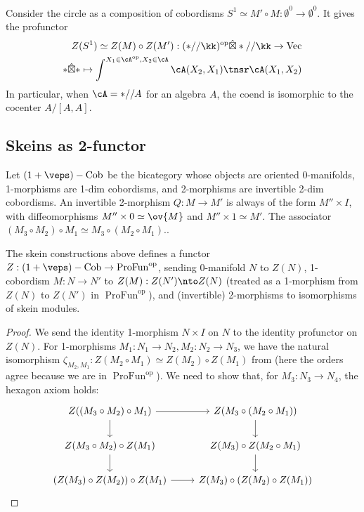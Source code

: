 \documentclass[12pt]{article}
\newcommand{\empt}[1]{{\emptyset^{#1}}}
\newcommand{\op}{{\text{op}}}
\newcommand{\hatbox}{{\hat{\boxtimes}}}
\DeclareMathOperator{\Vect}{Vec}
\DeclareMathOperator{\Profun}{ProFun}
\newcommand{\Profunop}{{\Profun}^\op}
\newcommand{\epsCob}{{(1+\veps)-\text{Cob}}}
\begin{document}
\begin{example}
Consider the circle as a composition of cobordisms
$S^1 \simeq M' \circ M : \empt{0} \to \empt{0}$.
It gives the profunctor
\begin{align*}
Z(S^1) \simeq Z(M) \circ Z(M') :
(*//\kk)^\op \hatbox *//\kk \to \Vect
\\
* \hatbox * \mapsto
\int^{X_1 \in \cA^\op, X_2 \in \cA} \cA(X_2,X_1) \tnsr \cA(X_1,X_2) \end{align*}
In particular, when $\cA = *//A$ for an algebra $A$,
the coend is isomorphic to the cocenter $A/[A,A]$.
\end{example}



\subsection{Skeins as 2-functor}

Let $\epsCob$ be the bicategory whose objects are
oriented 0-manifolds,
1-morphisms are 1-dim cobordisms,
and 2-morphisms are invertible 2-dim cobordisms.
An invertible 2-morphism $Q: M \to M'$
is always of the form $M'' \times I$,
with diffeomorphisms $M'' \times 0 \simeq \ov{M}$
and $M'' \times 1 \simeq M'$.
The associator
$(M_3 \circ M_2) \circ M_1 \simeq M_3 \circ (M_2 \circ M_1)$..


\begin{proposition}
The skein constructions above defines a functor
$Z: \epsCob \to \Profunop$,
sending 0-manifold $N$ to $Z(N)$,
1-cobordism $M: N \to N'$
to $Z(M) : Z(N') \nto Z(N)$
(treated as a 1-morphism from $Z(N)$ to $Z(N')$ in $\Profunop$),
and (invertible) 2-morphisms to
isomorphisms of skein modules.
\end{proposition}

\begin{proof}
We send the identity 1-morphism $N \times I$ on $N$
to the identity profunctor on $Z(N)$.
For 1-morphisms $M_1 : N_1 \to N_2, M_2 : N_2 \to N_3$,
we have the natural isomorphism
$\zeta_{M_2,M_1} : Z(M_2 \circ M_1) \simeq Z(M_2) \circ Z(M_1)$
from 
(here the orders agree because we are in $\Profunop$).
We need to show that, for $M_3 : N_3 \to N_4$,
the hexagon axiom holds:
\[
\begin{tikzcd}
Z((M_3 \circ M_2) \circ M_1)
\ar[r] \ar[d]
& Z(M_3 \circ (M_2 \circ M_1))
\ar[d]
\\
Z(M_3 \circ M_2) \circ Z(M_1)
\ar[d]
&
Z(M_3) \circ Z(M_2 \circ M_1)
\ar[d]
\\
(Z(M_3) \circ Z(M_2)) \circ Z(M_1)
\ar[r]
&
Z(M_3) \circ (Z(M_2) \circ Z(M_1))
\end{tikzcd}
\]
\end{proof}
\end{document}
